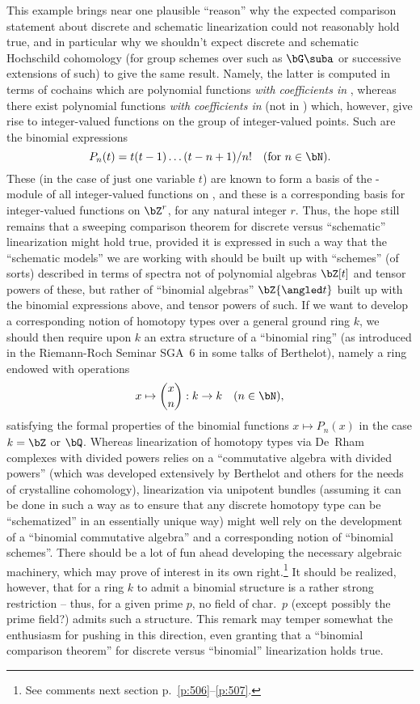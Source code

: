 This example brings near one plausible ``reason'' why the expected
comparison statement about discrete and schematic linearization could
not reasonably hold true, and in particular why we shouldn't expect
discrete and schematic Hochschild cohomology (for group schemes over
\bZ{} such as $\bG\suba$ or successive extensions of such)
to give the same result. Namely, the latter is computed in terms of
cochains which are polynomial functions \emph{with coefficients in
  \bZ}, whereas there exist polynomial functions \emph{with
  coefficients in \bQ} (not in \bZ) which, however, give rise to
integer-valued functions on the group of integer-valued points. Such
are the binomial expressions
\[P_n(t) = t(t-1)\dots(t-n+1)/n!\quad\text{(for $n\in\bN$).}\]
These (in the case of just one variable $t$) are known to form a basis
of the \bZ-module of all integer-valued functions on \bZ, and these is
a corresponding basis for integer-valued functions on $\bZ^r$, for any
natural integer $r$. Thus, the hope still remains that a sweeping
comparison theorem for discrete versus ``schematic'' linearization
might hold true, provided it is expressed in such a way that the
``schematic models'' we are working with should be built up with
``schemes'' (of sorts) described in terms of spectra not of polynomial
algebras $\bZ[t]$ and tensor powers of these, but rather of ``binomial
algebras'' $\bZ{\angled t}$ built up with the binomial expressions
above, and tensor powers of such. If we want to develop a
corresponding notion of homotopy types over a general ground ring $k$,
we should then require upon $k$ an extra structure of a ``binomial
ring'' (as introduced in the Riemann-Roch Seminar SGA~6 in some talks
of Berthelot), namely a ring
endowed with operations
\[x\mapsto \binom xn : k\to k \quad (n\in\bN),\]
satisfying the formal properties of the binomial functions $x\mapsto
P_n(x)$ in the case $k=\bZ$ or $\bQ$. Whereas linearization of
homotopy types via De~Rham complexes with divided powers relies on a
``commutative algebra with divided powers'' (which was developed
extensively by Berthelot and others for the needs of crystalline
cohomology), linearization via unipotent bundles (assuming it can be
done in such a way as to ensure that any discrete homotopy type can be
``schematized'' in an essentially unique way) might well rely on the
development of a ``binomial commutative algebra'' and a corresponding
notion of ``binomial schemes''. There should be a lot of fun ahead
developing the necessary algebraic machinery, which may prove of
interest in its own right.\footnote{See comments next section
  p.~\ref{p:506}--\ref{p:507}.} It should be realized, however, that
for a ring $k$ to admit a binomial structure is a rather strong
restriction -- thus, for a given prime $p$, no field of char.~$p$
(except possibly the prime field?) admits such a structure. This
remark may temper somewhat the enthusiasm for pushing in this
direction, even granting that a ``binomial comparison theorem'' for
discrete versus ``binomial'' linearization holds true.

